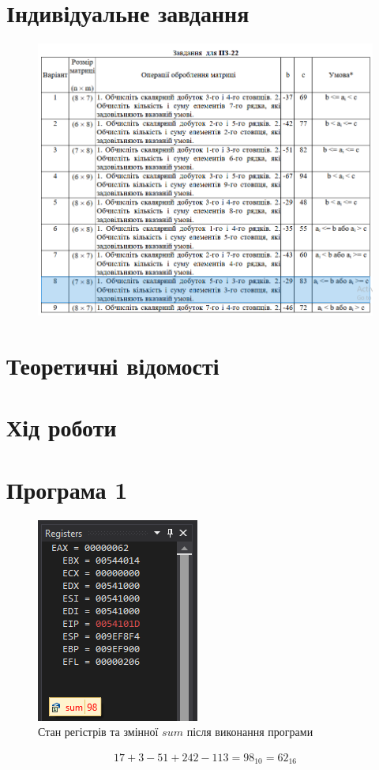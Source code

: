 \documentclass{article}
\begin{document}
\begin{normalsize}
	\section*{Індивідуальне завдання}
	\begin{figure}[H]
		\centering
		\includegraphics[scale=0.6]{v}
	\end{figure}	

	\section*{Теоретичні відомості}
	
	\section*{Хід роботи}
	\section*{Програма 1}
	\begin{figure}[H]
		\centering
		\includegraphics[scale=1]{1}
		\caption{Стан регістрів та змінної $sum$ після виконання програми}
	\end{figure}
	\begin{gather}
		17+3-51+242-113=98_{10}=62_{16}\nonumber
	\end{gather}


\end{normalsize}
\end{document}
